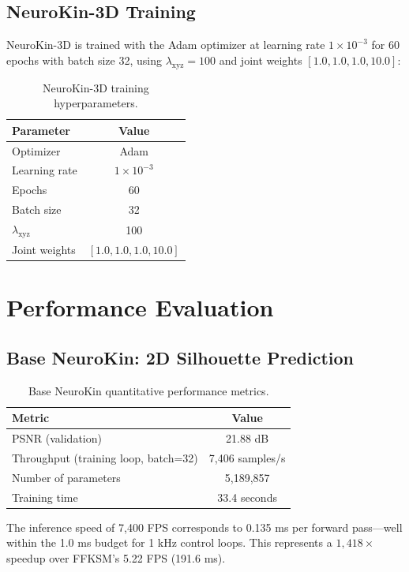 \documentclass[12pt,a4paper,oneside]{report}
\begin{document}
\subsection{NeuroKin-3D Training}

NeuroKin-3D is trained with the Adam optimizer at learning rate $1 \times 10^{-3}$ for 60 epochs with batch size 32, using $\lambda_{\text{xyz}} = 100$ and joint weights $[1.0, 1.0, 1.0, 10.0]$:

\begin{table}[H]
\centering
\caption{NeuroKin-3D training hyperparameters.}
\label{tab:neurokin3d_hyperparams}
\begin{tabular}{lc}
\toprule
Parameter & Value \\
\midrule
Optimizer & Adam \\
Learning rate & $1 \times 10^{-3}$ \\
Epochs & 60 \\
Batch size & 32 \\
$\lambda_{\text{xyz}}$ & 100 \\
Joint weights & $[1.0, 1.0, 1.0, 10.0]$ \\
\bottomrule
\end{tabular}
\end{table}

\section{Performance Evaluation}

\subsection{Base NeuroKin: 2D Silhouette Prediction}

\begin{table}[H]
\centering
\caption{Base NeuroKin quantitative performance metrics.}
\label{tab:neurokin_performance}
\begin{tabular}{lc}
\toprule
Metric & Value \\
\midrule
PSNR (validation) & 21.88 dB \\
Throughput (training loop, batch=32) & 7,406 samples/s \\
Number of parameters & 5,189,857 \\
Training time & 33.4 seconds \\
\bottomrule
\end{tabular}
\end{table}

The inference speed of 7,400 FPS corresponds to 0.135 ms per forward pass---well within the 1.0 ms budget for 1 kHz control loops. This represents a $1,418\times$ speedup over FFKSM's 5.22 FPS (191.6 ms).
\end{document}

